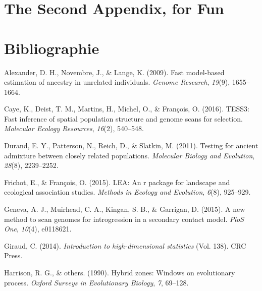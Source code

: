 \documentclass[12pt,twoside]{reedthesis}
\begin{document}
  \chapter{The Second Appendix, for
  Fun}\label{the-second-appendix-for-fun}
  
  \backmatter
  
  \chapter*{Bibliographie}\label{bibliographie}
  
  \noindent
  
  \setlength{\parindent}{-0.20in} \setlength{\leftskip}{0.20in}
  \setlength{\parskip}{8pt}
  
  \hypertarget{refs}{}
  \hypertarget{ref-alexander2009fast}{}
  Alexander, D. H., Novembre, J., \& Lange, K. (2009). Fast model-based
  estimation of ancestry in unrelated individuals. \emph{Genome Research},
  \emph{19}(9), 1655--1664.
  
  \hypertarget{ref-caye2016tess3}{}
  Caye, K., Deist, T. M., Martins, H., Michel, O., \& François, O. (2016).
  TESS3: Fast inference of spatial population structure and genome scans
  for selection. \emph{Molecular Ecology Resources}, \emph{16}(2),
  540--548.
  
  \hypertarget{ref-durand2011testing}{}
  Durand, E. Y., Patterson, N., Reich, D., \& Slatkin, M. (2011). Testing
  for ancient admixture between closely related populations.
  \emph{Molecular Biology and Evolution}, \emph{28}(8), 2239--2252.
  
  \hypertarget{ref-frichot2015lea}{}
  Frichot, E., \& François, O. (2015). LEA: An r package for landscape and
  ecological association studies. \emph{Methods in Ecology and Evolution},
  \emph{6}(8), 925--929.
  
  \hypertarget{ref-geneva2015new}{}
  Geneva, A. J., Muirhead, C. A., Kingan, S. B., \& Garrigan, D. (2015). A
  new method to scan genomes for introgression in a secondary contact
  model. \emph{PloS One}, \emph{10}(4), e0118621.
  
  \hypertarget{ref-giraud2014introduction}{}
  Giraud, C. (2014). \emph{Introduction to high-dimensional statistics}
  (Vol. 138). CRC Press.
  
  \hypertarget{ref-harrison1990hybrid}{}
  Harrison, R. G., \& others. (1990). Hybrid zones: Windows on
  evolutionary process. \emph{Oxford Surveys in Evolutionary Biology},
  \emph{7}, 69--128.
  
\end{document}
